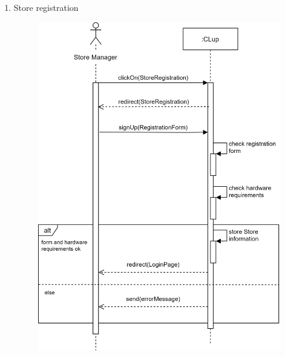 \documentclass[]{article}
\begin{document}
\begin{enumerate}
						\item Store registration
						\begin{figure}[H]
							\centering
							\includegraphics[scale=1.1]{signUpstore.png}
							\caption{}
							\label{fig:storeRegistration_sequencediagramm}
						\end{figure}
						\newpage
						

\end{enumerate}
\end{document}
